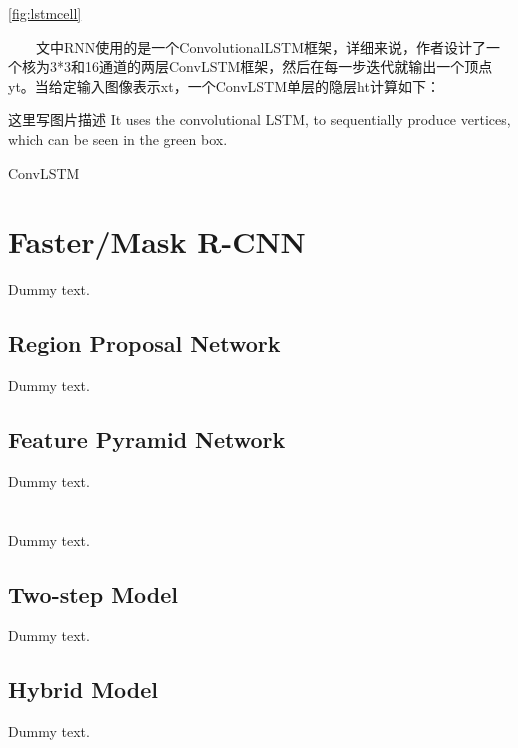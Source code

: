 \ref{fig:lstmcell}


　　文中RNN使用的是一个ConvolutionalLSTM框架，详细来说，作者设计了一个核为3*3和16通道的两层ConvLSTM框架，然后在每一步迭代就输出一个顶点yt。当给定输入图像表示xt，一个ConvLSTM单层的隐层ht计算如下：


这里写图片描述
It uses the convolutional LSTM, to sequentially produce vertices, which can be seen in the green box.

ConvLSTM

\section{Faster/Mask R-CNN}\label{modrcnn}

Dummy text.

\subsection{Region Proposal Network}\label{modrpn}

Dummy text.

\subsection{Feature Pyramid Network}\label{modfpn}

Dummy text.

\section{\modelnameshort}\label{modmer}

Dummy text.

\subsection{Two-step Model}

Dummy text.

\subsection{Hybrid Model}

Dummy text.

